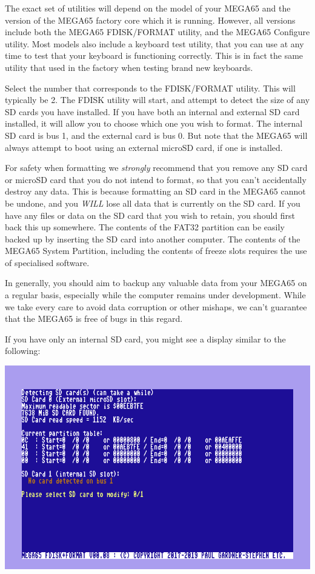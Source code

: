 The exact set of utilities will
depend on the model of your MEGA65 and the version of the MEGA65
factory core which it is running. However, all versions include both
the MEGA65 FDISK/FORMAT utility, and the MEGA65 Configure utility.
Most models also include a keyboard test utility, that you can use at
any time to test that your keyboard is functioning correctly.  This is
in fact the same utility that used in the factory when testing brand
new keyboards.

Select the number that corresponds to the FDISK/FORMAT utility.  This
will typically be 2.  The FDISK utility will start, and attempt to
detect the size of any SD cards you have installed.  If you have both
an internal and external SD card installed, it will allow you to
choose which one you wish to format. The internal SD card is bus 1,
and the external card is bus 0.  But note that the MEGA65 will
always attempt to boot using an external microSD card, if one is
installed.

For safety when formatting we {\em strongly} recommend
that you remove any SD card or microSD card that you do not intend to
format, so that you can't accidentally destroy any data.  This is
because formatting an SD card in the MEGA65 cannot be undone, and you
{\em WILL} lose all data that is currently on the SD card.  If you
have any files or data on the SD card that you wish to retain, you
should first back this up somewhere.  The contents of the FAT32
partition can be easily backed up by inserting the SD card into
another computer.  The contents of the MEGA65 System Partition,
including the contents of freeze slots requires the use of specialised
software.

In generally, you should aim to backup any valuable data from your
MEGA65 on a regular basis, especially while the computer remains under
development.  While we take every care to avoid data corruption or
other mishaps, we can't guarantee that the MEGA65 is free of bugs in
this regard.

If you have only an internal SD card, you might see a
display similar to the following:

\includegraphics[width=\linewidth]{images/ss-m65fdisk-busselect.png}

